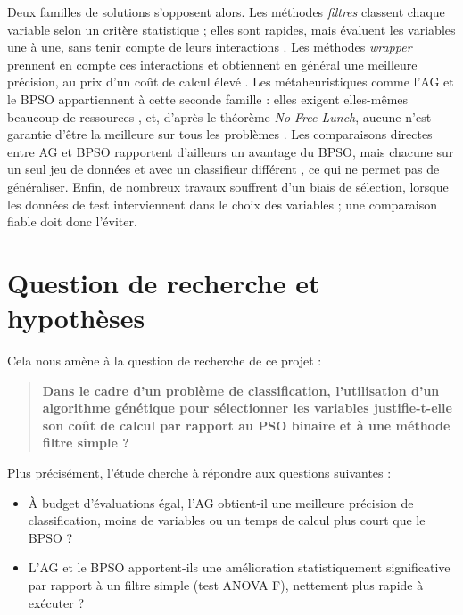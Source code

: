 \documentclass[11pt,a4paper]{report}
\begin{document}
Deux familles de solutions s'opposent alors. Les méthodes \emph{filtres} classent chaque variable
selon un critère statistique ; elles sont rapides, mais évaluent les variables une à une, sans
tenir compte de leurs interactions \cite{guyon2003,xue2016}. Les méthodes \emph{wrapper} prennent
en compte ces interactions et obtiennent en général une meilleure précision, au prix d'un coût de
calcul élevé \cite{xue2016,dokeroglu2022}. Les métaheuristiques comme l'AG et le BPSO
appartiennent à cette seconde famille : elles exigent elles-mêmes beaucoup de ressources
\cite{xue2016,ludwig2025}, et, d'après le théorème \emph{No Free Lunch}, aucune n'est garantie
d'être la meilleure sur tous les problèmes \cite{dokeroglu2022}. Les comparaisons directes entre
AG et BPSO rapportent d'ailleurs un avantage du BPSO, mais chacune sur un seul jeu de données et
avec un classifieur différent \cite{babaoglu2010,rafdi2021}, ce qui ne permet pas de généraliser. Enfin, de nombreux travaux souffrent d'un
biais de sélection, lorsque les données de test interviennent dans le choix des variables
\cite{xue2016,ambroise2002} ; une comparaison fiable doit donc l'éviter.

\section*{Question de recherche et hypothèses}
Cela nous amène à la question de recherche de ce projet :

\begin{quote}
\textbf{Dans le cadre d'un problème de classification, l'utilisation d'un algorithme génétique pour
sélectionner les variables justifie-t-elle son coût de calcul par rapport au PSO binaire et à une
méthode filtre simple ?}
\end{quote}

\noindent Plus précisément, l'étude cherche à répondre aux questions suivantes :
\begin{itemize}
  \item[\textbf{Q1}] À budget d'évaluations égal, l'AG obtient-il une meilleure précision de
        classification, moins de variables ou un temps de calcul plus court que le BPSO ?
  \item[\textbf{Q2}] L'AG et le BPSO apportent-ils une amélioration statistiquement significative
        par rapport à un filtre simple (test ANOVA F), nettement plus rapide à exécuter ?
\end{itemize}
\end{document}
